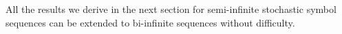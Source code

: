 \documentclass[final]{siamltex}
\begin{document}
All the results we derive in the next section for semi-infinite
stochastic symbol sequences can be extended to bi-infinite sequences
without difficulty.



\end{document}
